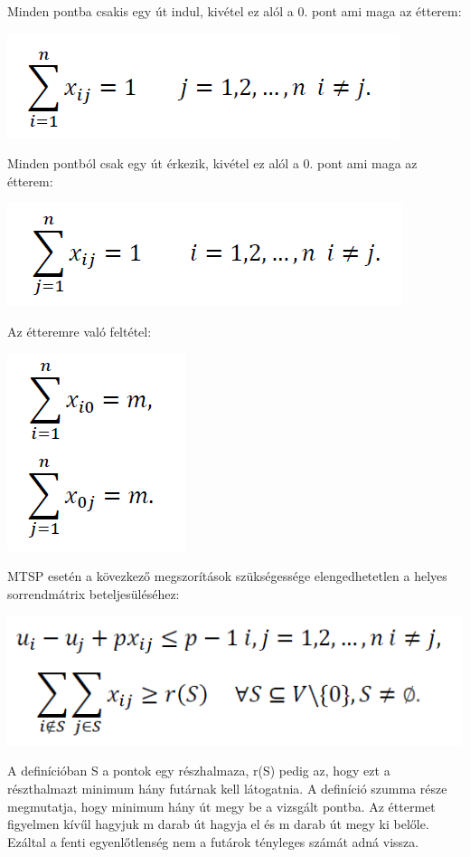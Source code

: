 Minden pontba csakis egy út indul, kivétel ez alól a 0. pont ami maga az étterem:

\includegraphics[scale=0.5]{images/mtsp2.png}

Minden pontból csak egy út érkezik, kivétel ez alól a 0. pont ami maga az étterem:

\includegraphics[scale=0.5]{images/mtsp3.png}

Az étteremre való feltétel:

\includegraphics[scale=0.5]{images/mtsp4.png}

MTSP esetén a kövezkező megszorítások szükségessége elengedhetetlen a helyes sorrendmátrix beteljesüléséhez:

\includegraphics[scale=0.5]{images/mtsp5.png}

A definícióban S a pontok egy részhalmaza, r(S) pedig az, hogy ezt a részthalmazt minimum hány futárnak kell látogatnia. A definíció szumma része megmutatja, hogy minimum hány út megy be a vizsgált pontba. Az éttermet figyelmen kívűl hagyjuk m darab út hagyja el és m darab út megy ki belőle. Ezáltal a fenti egyenlőtlenség nem a futárok tényleges számát adná vissza. 


